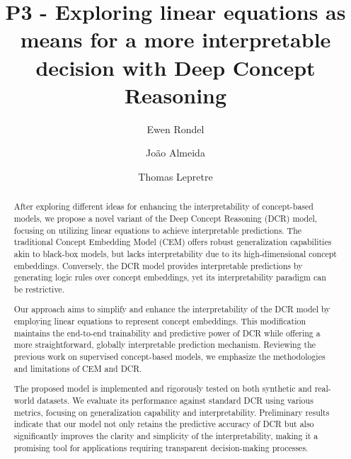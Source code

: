 \documentclass[sigconf, nonacm]{acmart}
\begin{document}
\title{P3 - Exploring linear equations as means for a more interpretable decision with Deep Concept Reasoning}

\author{Ewen Rondel}

\author{João Almeida}
\author{Thomas Lepretre}



\begin{abstract}
After exploring different ideas for enhancing the interpretability of concept-based models, we propose a novel variant of the Deep Concept Reasoning (DCR) model, focusing on utilizing linear equations to achieve interpretable predictions. The traditional Concept Embedding Model (CEM) offers robust generalization capabilities akin to black-box models, but lacks interpretability due to its high-dimensional concept embeddings. Conversely, the DCR model provides interpretable predictions by generating logic rules over concept embeddings, yet its interpretability paradigm can be restrictive.

Our approach aims to simplify and enhance the interpretability of the DCR model by employing linear equations to represent concept embeddings. This modification maintains the end-to-end trainability and predictive power of DCR while offering a more straightforward, globally interpretable prediction mechanism. Reviewing the previous work on supervised concept-based models, we emphasize the methodologies and limitations of CEM and DCR.

The proposed model is implemented and rigorously tested on both synthetic and real-world datasets. We evaluate its performance against standard DCR using various metrics, focusing on generalization capability and interpretability. Preliminary results indicate that our model not only retains the predictive accuracy of DCR but also significantly improves the clarity and simplicity of the interpretability, making it a promising tool for applications requiring transparent decision-making processes.
\end{abstract}
\end{document}
